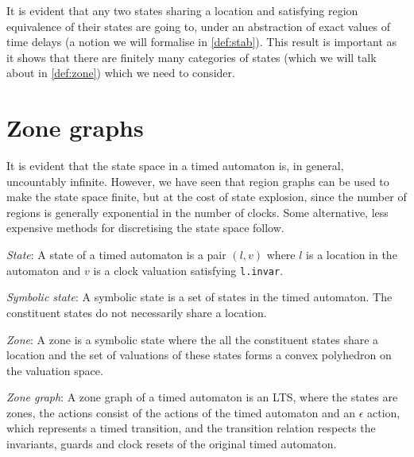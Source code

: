 \documentclass[a4paper]{llncs}
\begin{document}
It is evident that any two states sharing a location and satisfying
region equivalence of their states are going to, under an abstraction
of exact values of time delays (a notion we will formalise in
\ref{def:stab}). This result is important as it shows that there are
finitely many categories of states (which we will talk about in
\ref{def:zone}) which we need to consider.

\section{Zone graphs}

It is evident that the state space in a timed automaton is, in
general, uncountably infinite. However, we have seen that region
graphs can be used to make the state space finite, but at the cost of
state explosion, since the number of regions is generally exponential
in the number of clocks. Some alternative, less expensive methods for
discretising the state space follow.

\begin{definition}
  \emph{State}: A state of a timed automaton is a pair $(l, v)$
  where $l$ is a location in the automaton and $v$ is a clock
  valuation satisfying \texttt{l.invar}.
\end{definition}

\begin{definition}
  \emph{Symbolic state}: A symbolic state is a set of states in
  the timed automaton. The constituent states do not necessarily share
  a location.
\end{definition}

\begin{definition}
\label{def:zone}
  \emph{Zone}: A zone is a symbolic state where the all the
  constituent states share a location and the set of valuations of
  these states forms a convex polyhedron on the valuation space.
\end{definition}

\begin{definition}
  \emph{Zone graph}: A zone graph of a timed automaton is an LTS, where
  the states are zones, the actions consist of the actions of the
  timed automaton and an $\epsilon$ action, which represents a timed
  transition, and the transition relation respects the invariants,
  guards and clock resets of the original timed automaton.
\end{definition}
\end{document}
